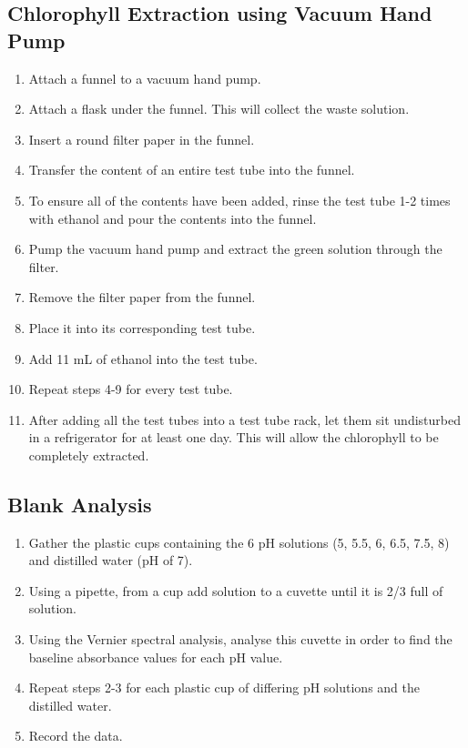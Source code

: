 \documentclass[a4paper]{article}
\begin{document}
\subsection*{Chlorophyll Extraction using Vacuum Hand Pump}
\begin{enumerate}
\item Attach a funnel to a vacuum hand pump.
\item Attach a flask under the funnel. This will collect the waste solution.
\item Insert a round filter paper in the funnel.
\item Transfer the content of an entire test tube into the funnel.
\item To ensure all of the contents have been added, rinse the test tube 1-2 times with ethanol and pour the contents into the funnel. 
\item Pump the vacuum hand pump and extract the green solution through the filter.
\item Remove the filter paper from the funnel.
\item Place it into its corresponding test tube.
\item Add 11 mL of ethanol into the test tube.
\item Repeat steps 4-9 for every test tube.
\item After adding all the test tubes into a test tube rack, let them sit undisturbed in a refrigerator for at least one day. This will allow the chlorophyll to be completely extracted.
\end{enumerate}
\subsection*{Blank Analysis}
\begin{enumerate}
\item Gather the plastic cups containing the 6 pH solutions (5, 5.5, 6, 6.5, 7.5, 8) and distilled water (pH of 7).
\item Using a pipette, from a cup add solution to a cuvette until it is 2/3 full of solution.
\item Using the Vernier spectral analysis, analyse this cuvette in order to find the baseline absorbance values for each pH value. 
\item Repeat steps 2-3 for each plastic cup of differing pH solutions and the distilled water.
\item Record the data.
\end{enumerate}
\end{document}
